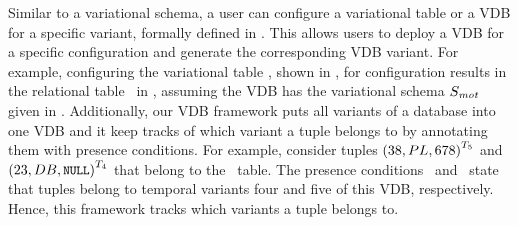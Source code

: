 Similar to a variational schema, a user
can configure a variational table or a VDB for a specific variant, formally defined in
. This allows users to deploy a VDB for a
specific configuration and generate the corresponding VDB variant.
For example, configuring the variational table \empbio, shown in ,
for configuration \setDef{\vThree, \edu, \tOne} results in the relational table \empbio\
in , assuming the VDB has the variational schema $\vSch_\mot$
given in \exref{vsch-mot}.
%
Additionally, 
our VDB framework puts all variants of a database into
one VDB 
and it keep tracks of which variant a tuple belongs to by 
annotating them with presence conditions. 
For example, consider tuples
\ensuremath{\annot [\tFive] {(38, PL, 678)}}
and 
\ensuremath{\annot [\tFour] {(23, DB, \nul)}}
that belong to the \ecourse\ table. 
The presence conditions \tFive\ and \tFour\ state that tuples belong to temporal
variants four and five of this VDB, respectively.
Hence, this framework tracks which variants a tuple belongs to.


